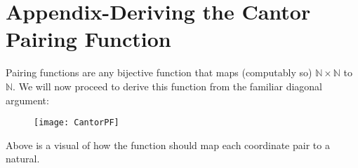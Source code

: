 \documentclass{article}
\begin{document}
\section{Appendix-Deriving the Cantor Pairing Function}
\par Pairing functions are any bijective function that maps (computably so) $\mathbb{N} \times \mathbb{N}$ to $\mathbb{N}$. We will now proceed to derive this function from the familiar diagonal argument: 
\begin{figure}[h]
\texttt{[image: CantorPF]}
\centering
\end{figure}
\par Above is a visual of how the function should map each coordinate pair to a natural.
\end{document}
